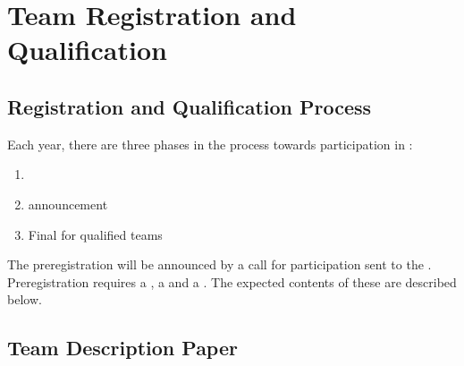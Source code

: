 \section{Team Registration and Qualification}


\subsection{Registration and Qualification Process}\label{rule:participation}

Each year, there are three phases in the process towards participation in \AtHome:
\begin{enumerate}
	\item {}
	\item {} announcement
	\item Final  for qualified teams
\end{enumerate}
The preregistration will be announced by a call for participation sent to the .
Preregistration requires a , a  and a .
The expected contents of these are described below.

\subsection{Team Description Paper}\label{rule:website_tdp}

